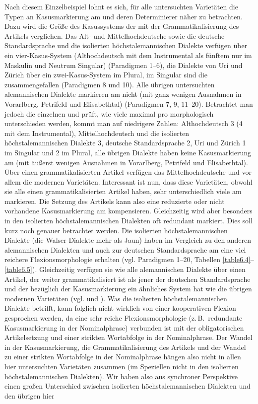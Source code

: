 Nach diesem Einzelbeispiel lohnt es sich, für alle untersuchten Varietäten die Typen an Kasusmarkierung am  und deren Determinierer näher zu betrachten. Dazu wird die Größe des Kasussystems der  mit der Grammatikalisierung des Artikels verglichen. Das Alt- und Mittelhochdeutsche sowie die deutsche Standardsprache und die isolierten höchstalemannischen Dialekte verfügen über ein vier-Kasus-System (Althochdeutsch mit dem Instrumental als fünftem  nur im Maskulin und Neutrum Singular) (Paradigmen 1–6), die Dialekte von Uri und Zürich über ein zwei-Kasus-System im Plural, im Singular sind die  zusammengefallen (Paradigmen 8 und 10). Alle übrigen untersuchten alemannischen Dialekte markieren  am  nicht (mit ganz wenigen Ausnahmen in Vorarlberg, Petrifeld und Elisabethtal) (Paradigmen 7, 9, 11–20). Betrachtet man jedoch die einzelnen  und prüft, wie viele  maximal pro  morphologisch unterschieden werden, kommt man auf niedrigere Zahlen: Althochdeutsch 3 (4 mit dem Instrumental), Mittelhochdeutsch und die isolierten höchstalemannischen Dialekte 3, deutsche Standardsprache 2, Uri und Zürich 1 im Singular und 2 im Plural, alle übrigen Dialekte haben keine Kasusmarkierung am  (mit äußerst wenigen Ausnahmen in Vorarlberg, Petrifeld und Elisabethtal). Über einen grammatikalisierten Artikel verfügen das Mittelhochdeutsche und vor allem die modernen Varietäten. Interessant ist nun, dass diese Varietäten, obwohl sie alle einen grammatikalisierten Artikel haben, sehr unterschiedlich viele  am  markieren. Die Setzung des Artikels kann also eine reduzierte oder nicht vorhandene Kasusmarkierung am  kompensieren. Gleichzeitig wird aber besonders in den isolierten höchstalemannischen Dialekten  oft redundant markiert. Dies soll kurz noch genauer betrachtet werden. Die isolierten höchstalemannischen Dialekte (die Walser Dialekte mehr als Jaun) haben im Vergleich zu den anderen alemannischen Dialekten und auch zur deutschen Standardsprache am  eine viel reichere Flexionsmorphologie erhalten (vgl. Paradigmen 1–20, Tabellen \ref{table6.4}–\ref{table6.5}). Gleichzeitig verfügen sie wie alle alemannischen Dialekte über einen Artikel, der weiter grammatikalisiert ist als jener der deutschen Standardsprache und der bezüglich der Kasusmarkierung ein ähnliches System hat wie die übrigen modernen Varietäten (vgl.  und ). Was die isolierten höchstalemannischen Dialekte betrifft, kann folglich nicht wirklich von einer kooperativen Flexion gesprochen werden, da eine sehr reiche Flexionsmorphologie (z.\,B.\ redundante Kasusmarkierung in der Nominalphrase) verbunden ist mit der obligatorischen Artikelsetzung und einer strikten Wortabfolge in der Nominalphrase. Der Wandel in der Kasusmarkierung, die Grammatikalisierung des Artikels und der Wandel zu einer strikten Wortabfolge in der Nominalphrase hängen also nicht in allen hier untersuchten Varietäten zusammen (im Speziellen nicht in den isolierten höchstalemannischen Dialekten). Wir haben also aus synchroner Perspektive einen großen Unterschied zwischen isolierten höchstalemannischen Dialekten und den übrigen hier 
